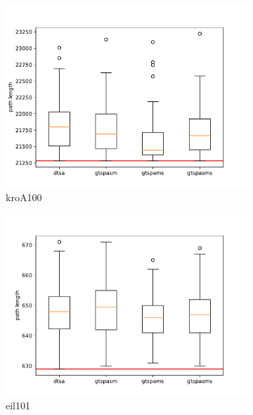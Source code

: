\documentclass[12pt]{article}
\theoremstyle{plain}
\theoremstyle{definition}
\theoremstyle{remark}
\begin{document}
\begin{figure}[h]
\begin{subfigure}{.5\textwidth}
		\includegraphics[width=\textwidth]{../../Implementation/gen/boxplot_kroA100}
		\caption{kroA100}
	\end{subfigure}%
	\begin{subfigure}{.5\textwidth}
		\centering
		\includegraphics[width=\textwidth]{../../Implementation/gen/boxplot_eil101}
		\caption{eil101}
	\end{subfigure}
	\begin{subfigure}{.5\textwidth}
		\centering

\end{subfigure}
\end{figure}
\end{document}
